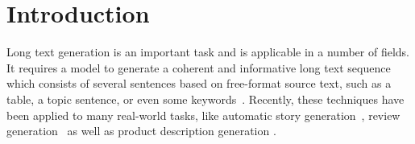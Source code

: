 \documentclass[letterpaper]{article} %
\begin{document}
\section{Introduction}

Long text generation is an important task and is applicable in a number of fields. It requires a model to generate a coherent and informative long text sequence which consists of several sentences based on free-format source text, such as a table, a topic sentence, or even some keywords~\cite{regina-et-al:table2text,nm:story_generation_2006,feng-et-al:2018topic}. 
Recently, these techniques have been applied to many real-world tasks, like automatic story generation~\cite{nm:story_generation_2006}, review generation~\cite{reviewe-generation} as well as product description generation \cite{chen-et-al:product_description_generation}. %


\end{document}
